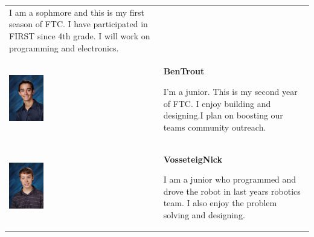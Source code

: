 \begin{tabular}{p{2cm}b{8cm}}
 \medskip 

 I am a sophmore and this is my first season of FTC. I have participated in FIRST since 4th grade. I will work on programming and electronics.\\
 
 \includegraphics[height=2cm,keepaspectratio=true]{./TeamSection/TroutBen.jpg}&

 \textbf{BenTrout}
 
 \medskip
 
 I'm a junior. This is my second year of FTC. I enjoy building and designing.I plan on boosting our teams community outreach. \\
 
 \includegraphics[height=2cm,keepaspectratio=true]{./TeamSection/VosseteigNick.jpg}&

 \textbf{VosseteigNick}
 
 \medskip
 
 I am a junior who programmed and drove the robot in last years robotics team. I also enjoy the problem solving and designing.\\
\end{tabular} 